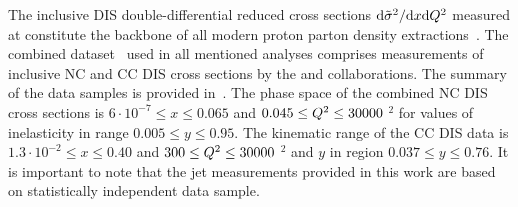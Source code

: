 The inclusive DIS double-differential reduced cross sections $\mathrm{d}\tilde\sigma^2/\mathrm{d}x\mathrm{d}\mbox{${Q^2}$}$ measured at \hera constitute the backbone of all modern proton parton density extractions~\cite{Lai:2010vv,Martin:2009iq,Alekhin:2012ig,Ball:2011uy,Aaron:2009aa}. The combined dataset~\cite{Aaron:2009aa} used in all mentioned analyses comprises measurements of inclusive NC and CC DIS cross sections by the \hone and \zeus collaborations. The summary of the data samples is provided in~\cite{Aaron:2009aa}. The phase space of the combined NC DIS cross sections is $6\cdot 10^{-7} \le x \le 0.065$ and $0.045 \le \mbox{${Q^2}$} \le 30000$ \GeV$^2$ for values of inelasticity in range $0.005 \le y \le 0.95$. The kinematic range of the CC DIS data is $1.3\cdot 10^{-2} \le x \le 0.40$ and $300 \le \mbox{${Q^2}$} \le 30000$ \GeV$^2$ and $y$ in region $0.037 \le y \le 0.76$. It is important to note that the jet measurements provided in this work are based on statistically independent data sample.

